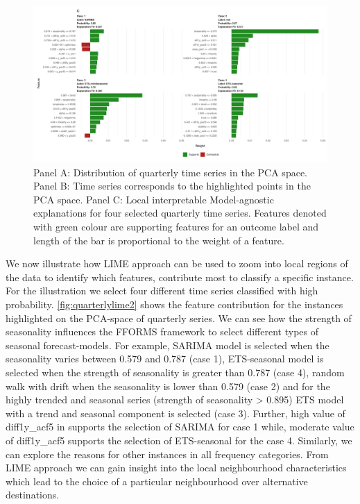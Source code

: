 \documentclass[11pt,a4paper,]{article}
\begin{document}
\begin{figure}[h]

{\centering \includegraphics{figures/quarterlylime2-1} 

}

\caption{Panel A: Distribution of quarterly time series in the PCA space. Panel B: Time series corresponds to the highlighted points in the PCA space. Panel C: Local interpretable Model-agnostic explanations for four selected quarterly time series. Features denoted with green colour are supporting features for an outcome label and length of the bar is proportional to the weight of a feature.}\label{fig:quarterlylime2}
\end{figure}

We now illustrate how LIME approach can be used to zoom into local regions of the data to identify which features, contribute most to classify a specific instance. For the illustration we select four different time series classified with high probability. \autoref{fig:quarterlylime2} shows the feature contribution for the instances highlighted on the PCA-space of quarterly series. We can see how the strength of seasonality influences the FFORMS framework to select different types of seasonal forecast-models. For example, SARIMA model is selected when the seasonality varies between 0.579 and 0.787 (case 1), ETS-seasonal model is selected when the strength of seasonality is greater than 0.787 (case 4), random walk with drift when the seasonality is lower than 0.579 (case 2) and for the highly trended and seasonal series (strength of seasonality \textgreater{} 0.895) ETS model with a trend and seasonal component is selected (case 3). Further, high value of diff1y\_acf5 in supports the selection of SARIMA for case 1 while, moderate value of diff1y\_acf5 supports the selection of ETS-seasonal for the case 4. Similarly, we can explore the reasons for other instances in all frequency categories. From LIME approach we can gain insight into the local neighbourhood characteristics which lead to the choice of a particular neighbourhood over alternative destinations.
\end{document}
